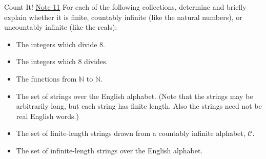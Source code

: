 \begin{homeworkProblem}{Count It!}
\href{https://www.eecs70.org/assets/pdf/notes/n11.pdf}{Note 11}
For each of the following collections, determine and briefly explain whether 
it is finite, countably infinite (like the natural numbers), or uncountably 
infinite (like the reals):

\begin{itemize}

\item The integers which divide $8$.

\solution

\item The integers which $8$ divides.

\solution

\item The functions from $\mathbb{N}$ to $\mathbb{N}$.

\solution

\item The set of strings over the English alphabet. (Note that the strings 
may be arbitrarily long, but each string has finite length. Also the strings 
need not be real English words.)

\solution

\item The set of finite-length strings drawn from a countably infinite 
alphabet, $\mathcal{C}$.

\solution

\item The set of infinite-length strings over the English alphabet.

\solution

\end{itemize}
\end{homeworkProblem}
